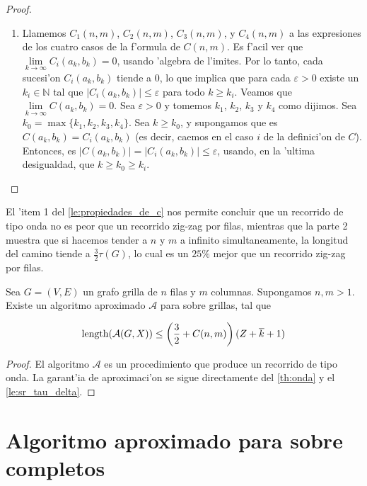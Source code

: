 \begin{lemma}
\begin{proof}
\begin{enumerate}
\item Llamemos $C_1(n, m)$, $C_2(n, m)$, $C_3(n, m)$, y $C_4(n, m)$ a las expresiones de los cuatro casos de la f'ormula de $C(n, m)$. Es f'acil ver que  $\lim \limits_{k \to \infty} C_i(a_k, b_k) = 0$, usando 'algebra de l'imites. Por lo tanto, cada sucesi'on $C_i(a_k, b_k)$ tiende a $0$, lo que implica que para cada $\varepsilon > 0$ existe un $k_i \in \mathbb{N}$ tal que $|C_i(a_k, b_k)| \leq \varepsilon$ para todo $k \geq k_i$. Veamos que $\lim \limits_{k \to \infty} C(a_k, b_k) = 0$. Sea $\varepsilon > 0$ y tomemos $k_1$, $k_2$, $k_3$ y $k_4$ como dijimos. Sea $k_0 = \max\{k_1, k_2, k_3, k_4\}$. Sea $k \geq k_0$, y supongamos que es $C(a_k, b_k) = C_i(a_k, b_k)$ (es decir, caemos en el caso $i$ de la definici'on de $C$). Entonces, es $|C(a_k, b_k)| = |C_i(a_k, b_k)| \leq \varepsilon$, usando, en la 'ultima desigualdad, que $k \geq k_0 \geq k_i$.

\end{enumerate}

\end{proof}
\end{lemma}

El 'item 1 del \autoref{le:propiedades_de_c} nos permite concluir que un recorrido de tipo onda no es peor que un recorrido zig-zag por filas, mientras que la parte 2 muestra que si hacemos tender a $n$ y $m$ a infinito simultaneamente, la longitud del camino tiende a $\frac{3}{2}\tau(G)$, lo cual es un $25\%$ mejor que un recorrido zig-zag por filas.

\begin{theorem}
Sea $G = (V, E)$ un grafo grilla de $n$ filas y $m$ columnas. Supongamos $n, m > 1$. Existe un algoritmo aproximado $\mathcal{A}$ para  sobre grillas, tal que

\[\textnormal{length}(\mathcal{A}(G, X)) \leq \left(\frac{3}{2} + C(n, m)\right)(Z + \overline{k} + 1)\]

\begin{proof}
El algoritmo $\mathcal{A}$ es un procedimiento que produce un recorrido de tipo onda. La garant'ia de aproximaci'on se sigue directamente del \autoref{th:onda} y el \autoref{le:sr_tau_delta}.
\end{proof}
\end{theorem}

\section{Algoritmo aproximado para  sobre completos}

